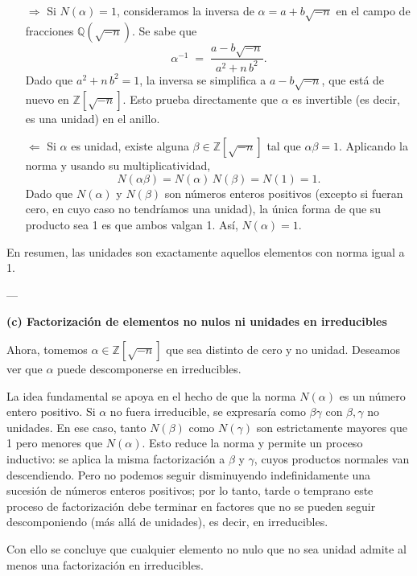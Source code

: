 \begin{itemize}
    \item[\(\Longrightarrow\)] Si $N(\alpha) = 1$, consideramos la inversa de $\alpha = a + b\sqrt{-n}$ en el campo de fracciones $\mathbb{Q}(\sqrt{-n})$. Se sabe que
    \[
    \alpha^{-1} \;=\; \frac{a - b\sqrt{-n}}{a^2 + n\,b^2}.
    \]
    Dado que $a^2 + n\,b^2 = 1$, la inversa se simplifica a $a - b\sqrt{-n}$, que está de nuevo en $\mathbb{Z}[\sqrt{-n}]$. Esto prueba directamente que $\alpha$ es invertible (es decir, es una unidad) en el anillo.
    
    \item[\(\Longleftarrow\)] Si $\alpha$ es unidad, existe alguna $\beta \in \mathbb{Z}[\sqrt{-n}]$ tal que $\alpha\beta = 1$. Aplicando la norma y usando su multiplicatividad,
    \[
    N(\alpha \beta) = N(\alpha)\,N(\beta) = N(1) = 1.
    \]
    Dado que $N(\alpha)$ y $N(\beta)$ son números enteros positivos (excepto si fueran cero, en cuyo caso no tendríamos una unidad), la única forma de que su producto sea 1 es que ambos valgan 1. Así, $N(\alpha)=1$.
\end{itemize}

En resumen, las unidades son exactamente aquellos elementos con norma igual a 1.

---

\noindent
\textbf{(c) Factorización de elementos no nulos ni unidades en irreducibles}

Ahora, tomemos $\alpha \in \mathbb{Z}[\sqrt{-n}]$ que sea distinto de cero y no unidad. Deseamos ver que $\alpha$ puede descomponerse en irreducibles. 

La idea fundamental se apoya en el hecho de que la norma $N(\alpha)$ es un número entero positivo. Si $\alpha$ no fuera irreducible, se expresaría como $\beta\gamma$ con $\beta,\gamma$ no unidades. En ese caso, tanto $N(\beta)$ como $N(\gamma)$ son estrictamente mayores que 1 pero menores que $N(\alpha)$. Esto reduce la norma y permite un proceso inductivo: se aplica la misma factorización a $\beta$ y $\gamma$, cuyos productos normales van descendiendo. Pero no podemos seguir disminuyendo indefinidamente una sucesión de números enteros positivos; por lo tanto, tarde o temprano este proceso de factorización debe terminar en factores que no se pueden seguir descomponiendo (más allá de unidades), es decir, en irreducibles. 

Con ello se concluye que cualquier elemento no nulo que no sea unidad admite al menos una factorización en irreducibles.

